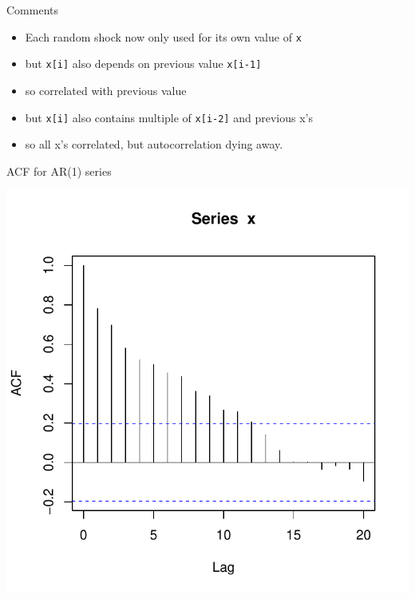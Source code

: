 \begin{frame}[fragile]{Comments}
  
  \begin{itemize}
\item Each random shock now only used for its own value of \texttt{x}
\item but \texttt{x[i]} also depends on previous value \texttt{x[i-1]}
\item so correlated with previous value
\item but \texttt{x[i]} also contains multiple of \texttt{x[i-2]} and
  previous x's 
\item so all x's correlated, but autocorrelation dying away.

  \end{itemize}
  
\end{frame}

\begin{frame}[fragile]{ACF for AR(1) series}
  
\begin{knitrout}
\color{fgcolor}\begin{kframe}
\begin{alltt}
\end{alltt}
\end{kframe}
\includegraphics[width=\maxwidth]{figure/dssahasjhs-1} 

\end{knitrout}
  
\end{frame}


